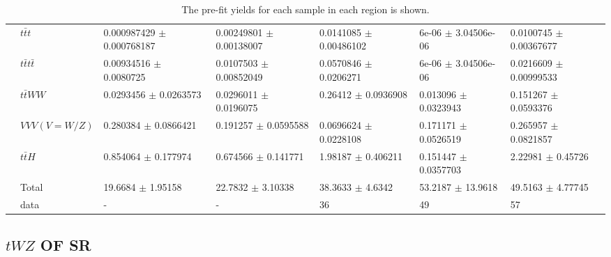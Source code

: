 \begin{table}[h!]
{\begin{tabular}{|ll|l|l|l|l|l|}
\multicolumn{1}{|l|}{}                       & $t\bar{t}t$          & 0.000987429 $\pm$ 0.000768187 & 0.00249801 $\pm$ 0.00138007 & 0.0141085 $\pm$ 0.00486102 & 6e-06 $\pm$ 3.04506e-06     & 0.0100745 $\pm$ 0.00367677 \\
\multicolumn{1}{|l|}{}                       & $t\bar{t}t\bar{t}$         & 0.00934516 $\pm$ 0.0080725    & 0.0107503 $\pm$ 0.00852049  & 0.0570846 $\pm$ 0.0206271  & 6e-06 $\pm$ 3.04506e-06     & 0.0216609 $\pm$ 0.00999533 \\
\multicolumn{1}{|l|}{}                       & $t\bar{t}WW$         & 0.0293456 $\pm$ 0.0263573     & 0.0296011 $\pm$ 0.0196075   & 0.26412 $\pm$ 0.0936908    & 0.013096 $\pm$ 0.0323943    & 0.151267 $\pm$ 0.0593376   \\
\multicolumn{1}{|l|}{}                       & $VVV (V = W/Z)$           & 0.280384 $\pm$ 0.0866421      & 0.191257 $\pm$ 0.0595588    & 0.0696624 $\pm$ 0.0228108  & 0.171171 $\pm$ 0.0526519    & 0.265957 $\pm$ 0.0821857   \\
\multicolumn{1}{|l|}{}                       & $t\bar{t}H$          & 0.854064 $\pm$ 0.177974       & 0.674566 $\pm$ 0.141771     & 1.98187 $\pm$ 0.406211     & 0.151447 $\pm$ 0.0357703    & 2.22981 $\pm$ 0.45726      \\ \hline
                                             & Total        & 19.6684 $\pm$ 1.95158         & 22.7832 $\pm$ 3.10338       & 38.3633 $\pm$ 4.6342       & 53.2187 $\pm$ 13.9618       & 49.5163 $\pm$ 4.77745      \\ \hline
                                             & data         & -                                         & -                                       & 36                                      & 49                                       & 57                                      \\ \hline
\end{tabular}}
\caption{The pre-fit yields for each sample in each region is shown.}
\label{tab:4Lep-PreFit-Yields}
\end{table}



\subsection{$tWZ$ OF SR}
\label{sec:controlplotstetralepton-tWZ-OF-SR}


